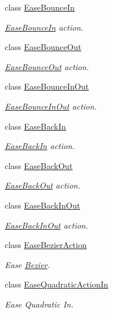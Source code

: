 \begin{DoxyCompactItemize}
class \hyperlink{classEaseBounceIn}{Ease\+Bounce\+In}
\begin{DoxyCompactList}\small\item\em \hyperlink{classEaseBounceIn}{Ease\+Bounce\+In} action. \end{DoxyCompactList}\item 
class \hyperlink{classEaseBounceOut}{Ease\+Bounce\+Out}
\begin{DoxyCompactList}\small\item\em \hyperlink{classEaseBounceOut}{Ease\+Bounce\+Out} action. \end{DoxyCompactList}\item 
class \hyperlink{classEaseBounceInOut}{Ease\+Bounce\+In\+Out}
\begin{DoxyCompactList}\small\item\em \hyperlink{classEaseBounceInOut}{Ease\+Bounce\+In\+Out} action. \end{DoxyCompactList}\item 
class \hyperlink{classEaseBackIn}{Ease\+Back\+In}
\begin{DoxyCompactList}\small\item\em \hyperlink{classEaseBackIn}{Ease\+Back\+In} action. \end{DoxyCompactList}\item 
class \hyperlink{classEaseBackOut}{Ease\+Back\+Out}
\begin{DoxyCompactList}\small\item\em \hyperlink{classEaseBackOut}{Ease\+Back\+Out} action. \end{DoxyCompactList}\item 
class \hyperlink{classEaseBackInOut}{Ease\+Back\+In\+Out}
\begin{DoxyCompactList}\small\item\em \hyperlink{classEaseBackInOut}{Ease\+Back\+In\+Out} action. \end{DoxyCompactList}\item 
class \hyperlink{classEaseBezierAction}{Ease\+Bezier\+Action}
\begin{DoxyCompactList}\small\item\em Ease \hyperlink{structBezier}{Bezier}. \end{DoxyCompactList}\item 
class \hyperlink{classEaseQuadraticActionIn}{Ease\+Quadratic\+Action\+In}
\begin{DoxyCompactList}\small\item\em Ease Quadratic In. \end{DoxyCompactList}\item 

\end{DoxyCompactItemize}
